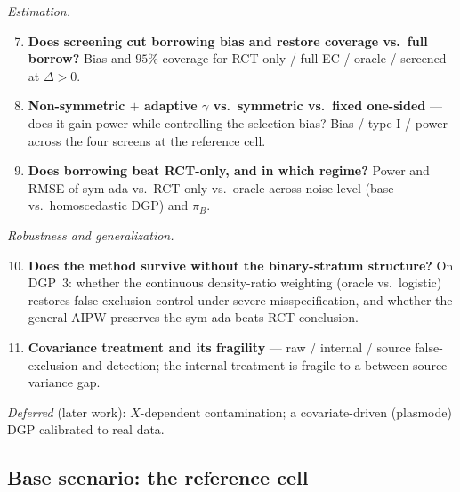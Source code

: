 \documentclass[11pt]{article}
\begin{document}
\emph{Estimation.}
\begin{enumerate}\setcounter{enumi}{6}
    \item \textbf{Does screening cut borrowing bias and restore coverage vs.\ full borrow?} Bias and $95\%$ coverage for RCT-only / full-EC / oracle / screened at $\Delta>0$.
    \item \textbf{Non-symmetric $+$ adaptive $\gamma$ vs.\ symmetric vs.\ fixed one-sided} --- does it gain power while controlling the selection bias? Bias / type-I / power across the four screens at the reference cell.
    \item \textbf{Does borrowing beat RCT-only, and in which regime?} Power and RMSE of sym-ada vs.\ RCT-only vs.\ oracle across noise level (base vs.\ homoscedastic DGP) and $\pi_B$.
\end{enumerate}

\emph{Robustness and generalization.}
\begin{enumerate}\setcounter{enumi}{9}
    \item \textbf{Does the method survive without the binary-stratum structure?} On DGP~3: whether the continuous density-ratio weighting (oracle vs.\ logistic) restores false-exclusion control under severe misspecification, and whether the general AIPW preserves the sym-ada-beats-RCT conclusion.
    \item \textbf{Covariance treatment and its fragility} --- raw / internal / source false-exclusion and detection; the internal treatment is fragile to a between-source variance gap.
\end{enumerate}

\emph{Deferred} (later work): $X$-dependent contamination; a covariate-driven (plasmode) DGP calibrated to real data.

\subsection{Base scenario: the reference cell}\label{sec:basecell}
\end{document}
